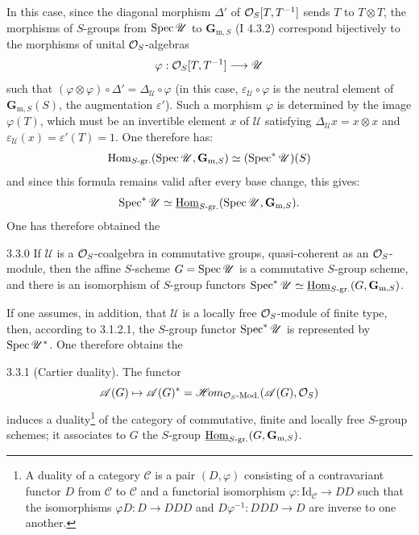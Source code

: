 In this case, since the diagonal morphism $\Delta'$ of $\mathcal{O}_S[T,T^{-1}]$ sends $T$ to $T\otimes T$, the morphisms of $S$-groups from $\operatorname{Spec}\mathscr U$ to $\mathbf G_{\mathrm m,S}$ (I 4.3.2) correspond bijectively to the morphisms of unital $\mathcal{O}_S$-algebras
\[
\varphi:\mathcal{O}_S[T,T^{-1}]\longrightarrow\mathscr U
\]
such that $(\varphi\otimes\varphi)\circ\Delta'=\Delta_{\mathscr U}\circ\varphi$ (in this case, $\varepsilon_{\mathscr U}\circ\varphi$ is the neutral element of $\mathbf G_{\mathrm m,S}(S)$, \ie the augmentation $\varepsilon'$). Such a morphism $\varphi$ is determined by the image $\varphi(T)$, which must be an invertible element $x$ of $\mathscr U$ satisfying $\Delta_{\mathscr U}x=x\otimes x$ and $\varepsilon_{\mathscr U}(x)=\varepsilon'(T)=1$. One therefore has:
\[
\operatorname{Hom}_{S\text{-gr.}}(\operatorname{Spec}\mathscr U,\mathbf G_{\mathrm m,S})\simeq(\operatorname{Spec}^*\mathscr U)(S)
\]
and since this formula remains valid after every base change, this gives:
\[
\operatorname{Spec}^*\mathscr U\simeq\underline{\operatorname{Hom}}_{S\text{-gr.}}(\operatorname{Spec}\mathscr U,\mathbf G_{\mathrm m,S}).
\]
One has therefore obtained the
\begin{proposition}{3.3.0}\label{VIIA.3.3.0}
If $\mathscr U$ is a $\mathcal{O}_S$-coalgebra in commutative groups, quasi-coherent as an $\mathcal{O}_S$-module, then the affine $S$-scheme $G=\operatorname{Spec}\mathscr U$ is a commutative $S$-group scheme, and there is an isomorphism of $S$-group functors $\operatorname{Spec}^*\mathscr U\simeq\underline{\operatorname{Hom}}_{S\text{-gr.}}(G,\mathbf G_{\mathrm m,S})$.
\end{proposition}
If one assumes, in addition, that $\mathscr U$ is a locally free $\mathcal{O}_S$-module of finite type, then, according to 3.1.2.1, the $S$-group functor $\operatorname{Spec}^*\mathscr U$ is represented by $\operatorname{Spec}\mathscr U^*$. One therefore obtains the
\begin{proposition}{3.3.1}\label{VIIA.3.3.1}
\textup{(Cartier duality).} The functor
\[
\mathscr A(G)\mapsto\mathscr A(G)^*=\mathscr H\!om_{\mathcal{O}_S\text{-Mod.}}(\mathscr A(G),\mathcal{O}_S)
\]
induces a duality{\renewcommand{\thefootnote}{*}\footnote{A duality of a category $\mathscr C$ is a pair $(D,\varphi)$ consisting of a contravariant functor $D$ from $\mathscr C$ to $\mathscr C$ and a functorial isomorphism $\varphi:\mathrm{Id}_{\mathscr C}\to DD$ such that the isomorphisms $\varphi D:D\to DDD$ and $D\varphi^{-1}:DDD\to D$ are inverse to one another.\footnotemark[38]}} of the category of commutative, finite and locally free $S$-group schemes; it associates to $G$ the $S$-group $\underline{\operatorname{Hom}}_{S\text{-gr.}}(G,\mathbf G_{\mathrm m,S})$.
\end{proposition}
\setcounter{footnote}{38}

